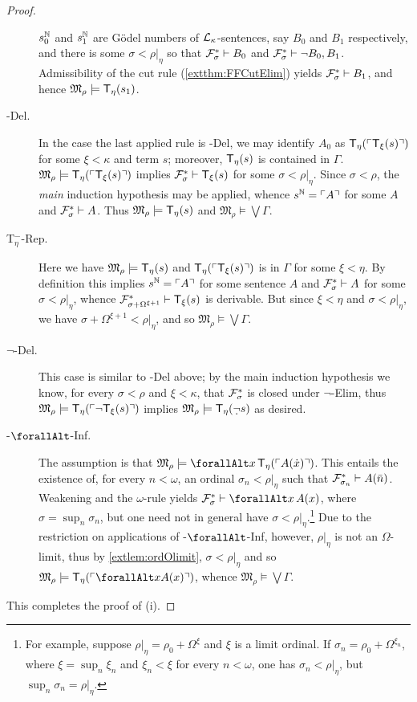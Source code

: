 \documentclass[UKenglish,cleveref,DIV=12]{scrartcl}
\let\forall\forallAlt
\theoremstyle{definition}
\theoremstyle{definition}
\begin{document}
\begin{proof}
\begin{description}
  $s_0^\mathbb N$ and $s_1^\mathbb N$ are Gödel numbers of $\mathcal{L}_\kappa$-sentences, say $B_0$
  and $B_1$ respectively, and there is some $\sigma<\rho|_\eta$ so
  that $\mathcal{F}^*_\sigma\vdash B_0$ and $\mathcal{F}^*_\sigma\vdash\lnot B_0,B_1$.
  Admissibility of the cut rule (\cref{extthm:FFCutElim}) yields $\mathcal{F}^*_\sigma\vdash B_1$, and hence
  $\mathfrak{M}_\rho\models \mathsf{T}_\eta(s_1)$.
\item [\normalfont\textT\eta-Del.] In the case the last applied rule is \textT\eta-Del,
  we may identify $A_0$ as $\mathsf{T}_\eta(\ulcorner{\mathsf{T}_\xi(s)}\urcorner)$ for some $\xi<\kappa$
  and  term $s$; moreover, $\mathsf{T}_\eta(s)$ is contained in $\Gamma$.
  $\mathfrak{M}_\rho\models \mathsf{T}_\eta(\ulcorner{\mathsf{T}_\xi(s)}\urcorner)$ implies $\mathcal{F}^*_\sigma\vdash
  \mathsf{T}_\xi(s)$ for some $\sigma<\rho|_\eta$. Since $\sigma<\rho$, the
  {\em  main} induction hypothesis may be applied, whence $s^\mathbb N=\ulcorner{A}\urcorner$ for some $A$
  and  $\mathcal{F}^*_\sigma\vdash A$. Thus $\mathfrak{M}_\rho\models \mathsf{T}_\eta(s)$ and
  $\mathfrak{M}_\rho\models\bigvee\Gamma$.
\item [\normalfont{}T$_\eta^-$-Rep.] Here we have $\mathfrak{M}_\rho\models \mathsf{T}_\eta(s)$ and
  $\mathsf{T}_\eta(\ulcorner{\mathsf{T}_\xi(s)}\urcorner)$ is in $\Gamma$ for some $\xi<\eta$. By definition this
  implies $s^\mathbb N=\ulcorner{A}\urcorner$ for some sentence $A$ and $\mathcal{F}^*_\sigma\vdash A$ for some
  $\sigma<\rho|_\eta$, whence $\mathcal{F}^*_{\sigma+\Omega^{\xi+1}}\vdash \mathsf{T}_\xi(s)$ is
  derivable. But since $\xi<\eta$ and $\sigma<\rho|_\eta$, we have
  $\sigma+\Omega^{\xi+1}<\rho|_\eta$, and so $\mathfrak{M}_\rho\models \bigvee\Gamma$.
\item [\normalfont{}$\lnot$\textT\eta-Del.] This case is similar to
  \textT\eta-Del above; by the main induction hypothesis we know, for every $\sigma<\rho$ and $\xi<\kappa$, that $\mathcal{F}^*_\sigma$
  is closed under $\lnot$\textT\xi-Elim, thus
  $\mathfrak{M}_\rho\models \mathsf{T}_\eta(\ulcorner{\lnot \mathsf{T}_\xi(s)}\urcorner)$ implies
  $\mathfrak{M}_\rho\models \T_\eta(\dlnot s)$ as desired.
\item [\normalfont{}\textT\eta-$\forall$-Inf.] The assumption is that
  $\mathfrak{M}_\rho\models\forall x\,\T_\eta(\gn{A(\dot x)})$. This entails the
  existence of, for every $n<\omega$, an ordinal $\sigma_n<\rho|_\eta$ such that
  $\mathcal{F}^*_{\sigma_n}\vdash A(\bar n)$. Weakening and the $\omega$-rule yields
  $\FF^*_\sigma\proves \forall x\,A(x)$, where $\sigma=\sup_n{\sigma_n}$, but
  one need not in general have $\sigma<\rho|_\eta$.\footnote{For example,
  suppose $\rho|_\eta=\rho_0+\Omega^\xi$ and $\xi$ is a limit ordinal. If
  $\sigma_n= \rho_0+\Omega^{\xi_n}$, where $\xi=\sup_n\xi_n$ and
  $\xi_n<\xi$ for every  $n<\omega$, one has $\sigma_n<\rho|_\eta$, but
  $\sup_n\sigma_n=\rho|_\eta$.} Due to the restriction on applications of
  \textT\eta-$\forall$-Inf, however, $\rho|_\eta$ is not an $\Omega$-limit,
  thus by \cref{extlem:ordOlimit}, $\sigma<\rho|_\eta$ and so
  $\mathfrak{M}_\rho\models \T_\eta(\gn{\forall xA(x)})$, whence
  $\mathfrak{M}_\rho\models\bigvee\Gamma$.
\end{description}
This completes the proof of (i).


\end{proof}
\end{document}
